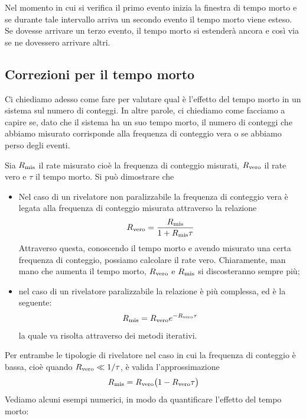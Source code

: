 Nel momento in cui si verifica il primo evento inizia la finestra di tempo morto e se durante tale intervallo arriva un secondo evento il tempo morto viene esteso. Se dovesse arrivare un terzo evento, il tempo morto si estenderà ancora e così via se ne dovessero arrivare altri. 

\subsection{Correzioni per il tempo morto}

Ci chiediamo adesso come fare per valutare qual è l'effetto del tempo morto in un sistema sul numero di conteggi. In altre parole, ci chiediamo come facciamo a capire se, dato che il sistema ha un suo tempo morto, il numero di conteggi che abbiamo misurato corrisponde alla frequenza di conteggio vera o se abbiamo perso degli eventi.

Sia $R_{\rm mis}$ il rate misurato cioè la frequenza di conteggio misurati, $R_{\rm vero}$ il rate vero e $\tau$ il tempo morto. Si può dimostrare che
\begin{itemize}[leftmargin=0.5cm]
   \item Nel caso di un rivelatore non paralizzabile la frequenza di conteggio vera è legata alla frequenza di conteggio misurata attraverso la relazione
   \begin{equation*}
      R_{\rm vero}=\frac{R_{\rm mis}}{1 + R_{\rm mis} \tau}
   \end{equation*}
   Attraverso questa, conoscendo il tempo morto e avendo misurato una certa frequenza di conteggio, possiamo calcolare il rate vero. Chiaramente, man mano che aumenta il tempo morto, $R_{\rm vero}$ e $R_{\rm mis}$ si discosteranno sempre più;
   \item nel caso di un rivelatore paralizzabile la relazione è più complessa, ed è la seguente:
   \begin{equation*}
      R_{\rm mis}=R_{\rm vero}e^{-R_{\rm vero} \tau}
   \end{equation*}
   la quale va risolta attraverso dei metodi iterativi.
\end{itemize}
Per entrambe le tipologie di rivelatore nel caso in cui la frequenza di conteggio è bassa, cioè quando $R_{\rm vero} \ll 1/\tau$, è valida l'approssimazione
\begin{equation*}
   R_{\rm mis}=R_{\rm vero}\bigl( 1 - R_{\rm vero} \tau \bigr)
\end{equation*}
Vediamo alcuni esempi numerici, in modo da quantificare l'effetto del tempo morto:

